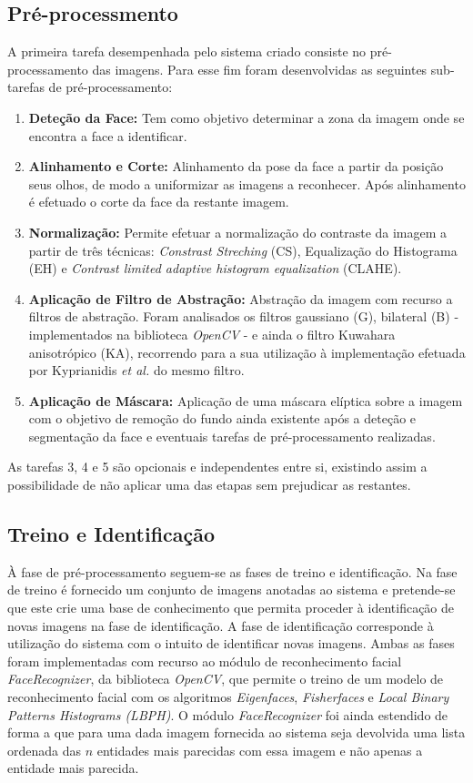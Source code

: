 \documentclass[9pt,a4paper]{extarticle}
\begin{document}
\begin{multicols}{2}
\subsection{Pré-processmento}\label{sec:pre-processamento}
A primeira tarefa desempenhada pelo sistema criado consiste no pré-processamento das imagens. Para esse fim foram desenvolvidas as seguintes sub-tarefas de pré-processamento:
\begin{enumerate}
\item \textbf{Deteção da Face:} Tem como objetivo determinar a zona da imagem onde se encontra a face a identificar.
\item \textbf{Alinhamento e Corte:} Alinhamento da pose da face a partir da posição seus olhos, de modo a uniformizar as imagens a reconhecer. Após alinhamento é efetuado o corte da face da restante imagem.
\item \textbf{Normalização:} Permite efetuar a normalização do contraste da imagem a partir de três técnicas:  \textit{Constrast Streching} (CS), Equalização do Histograma (EH) e \textit{Contrast limited adaptive histogram equalization} (CLAHE).
\item \textbf{Aplicação de Filtro de Abstração:} Abstração da imagem com recurso a filtros de abstração. Foram analisados os filtros gaussiano (G), bilateral (B) - implementados na biblioteca \textit{OpenCV} - e ainda o filtro Kuwahara anisotrópico (KA), recorrendo para a sua utilização à implementação efetuada por Kyprianidis \textit{et al.} \cite{Kyprianidis2009} do mesmo filtro.
\item \textbf{Aplicação de Máscara:} Aplicação de uma máscara elíptica sobre a imagem com o objetivo de remoção do fundo ainda existente após a deteção e segmentação da face e eventuais tarefas de pré-processamento realizadas.
\end{enumerate}

As tarefas 3, 4 e 5 são opcionais e independentes entre si, existindo assim a possibilidade de não aplicar uma das etapas sem prejudicar as restantes.

\subsection{Treino e Identificação}\label{sec:treino-id}
À fase de pré-processamento seguem-se as fases de treino e identificação. Na fase de treino é fornecido um conjunto de imagens anotadas ao sistema e pretende-se que este crie uma base de conhecimento que permita proceder à identificação de novas imagens na fase de identificação. A fase de identificação corresponde à utilização do sistema com o intuito de identificar novas imagens. Ambas as fases foram implementadas com recurso ao módulo de reconhecimento facial \textit{FaceRecognizer}, da biblioteca \textit{OpenCV}, que permite o treino de um modelo de reconhecimento facial com os algoritmos \textit{Eigenfaces}, \textit{Fisherfaces} e \textit{Local Binary Patterns Histograms  (LBPH)}. O módulo \textit{FaceRecognizer} foi ainda estendido de forma a que para uma dada imagem fornecida ao sistema seja devolvida uma lista ordenada das $n$ entidades mais parecidas com essa imagem e não apenas a entidade mais parecida.


\end{multicols}
\end{document}
